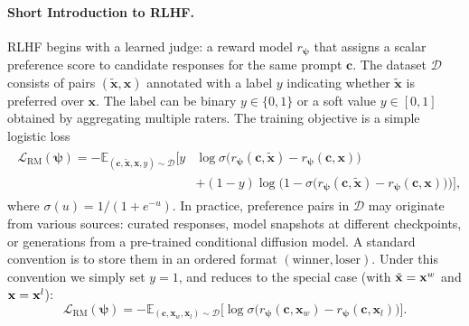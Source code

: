 \paragraph{Short Introduction to RLHF.}
RLHF begins with a learned judge: a reward model $r_{\bm\psi}$ that assigns a scalar preference score to candidate responses for the same prompt $\mathbf c$. The dataset $\mathcal D$ consists of pairs $(\tilde{\mathbf x},\mathbf x)$ annotated with a label $y$ indicating whether $\tilde{\mathbf x}$ is preferred over $\mathbf x$. The label can be binary $y\in\{0,1\}$ or a soft value $y\in[0,1]$ obtained by aggregating multiple raters. The training objective is a simple logistic loss
\begin{align}\label{eq:rm-emp}
\begin{aligned}
    \mathcal L_{\mathrm{RM}}(\bm\psi)
=
- \mathbb E_{(\mathbf c,\tilde{\mathbf x},\mathbf x,y)\sim\mathcal D}
\Big[
y &\log \sigma \big(r_{\bm\psi}(\mathbf c,\tilde{\mathbf x})-r_{\bm\psi}(\mathbf c,\mathbf x)\big)
\\ &+(1-y)\log \big(1-\sigma \big(r_{\bm\psi}(\mathbf c,\tilde{\mathbf x})-r_{\bm\psi}(\mathbf c,\mathbf x)\big)\big)
\Big],
\end{aligned}
\end{align}
where $\sigma(u)=1/(1+e^{-u})$. In practice, preference pairs in $\mathcal D$ may originate from various sources: curated responses, model snapshots at different checkpoints, or generations from a pre-trained conditional diffusion model.  
A standard convention is to store them in an ordered format $(\text{winner}, \text{loser})$.  
Under this convention we simply set $y=1$, and  reduces to the special case (with $\tilde{{\mathbf{x}}} = {\mathbf{x}}^w$ and ${\mathbf{x}} = {\mathbf{x}}^l$):
\begin{equation}\label{eq:rm-bt}
\mathcal L_{\mathrm{RM}}(\bm\psi)
=
- \mathbb E_{(\mathbf c,\mathbf x_w,\mathbf x_l)\sim\mathcal D}
\Big[\log \sigma \big(r_{\bm\psi}(\mathbf c,\mathbf x_w)-r_{\bm\psi}(\mathbf c,\mathbf x_l)\big)\Big].
\end{equation}


